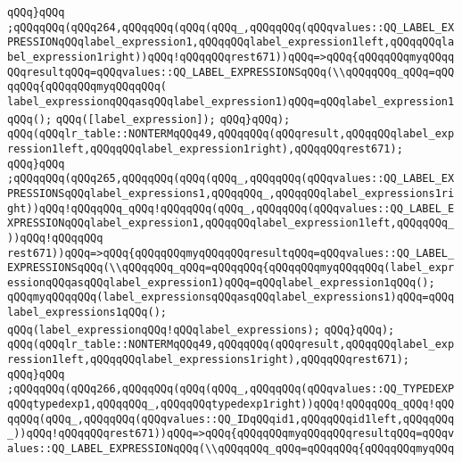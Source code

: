 \verb|qQQq}qQQq|\newline
\verb|;qQQqqQQq(qQQq264,qQQqqQQq(qQQq(qQQq_,qQQqqQQq(qQQqvalues::QQ_LABEL_EXPRESSIONqQQqlabel_expression1,qQQqqQQqlabel_expression1left,qQQqqQQqlabel_expression1right))qQQq!qQQqqQQqrest671))qQQq=>qQQq{qQQqqQQqmyqQQqqQQqresultqQQq=qQQqvalues::QQ_LABEL_EXPRESSIONSqQQq(\\qQQqqQQq_qQQq=qQQqqQQq{qQQqqQQqmyqQQqqQQq(|\newline
\verb|label_expressionqQQqasqQQqlabel_expression1)qQQq=qQQqlabel_expression1qQQq();|\newline
\verb|qQQq([label_expression]);|\newline
\verb|qQQq}qQQq);|\newline
\verb|qQQq(qQQqlr_table::NONTERMqQQq49,qQQqqQQq(qQQqresult,qQQqqQQqlabel_expression1left,qQQqqQQqlabel_expression1right),qQQqqQQqrest671);|\newline
\verb|qQQq}qQQq|\newline
\verb|;qQQqqQQq(qQQq265,qQQqqQQq(qQQq(qQQq_,qQQqqQQq(qQQqvalues::QQ_LABEL_EXPRESSIONSqQQqlabel_expressions1,qQQqqQQq_,qQQqqQQqlabel_expressions1right))qQQq!qQQqqQQq_qQQq!qQQqqQQq(qQQq_,qQQqqQQq(qQQqvalues::QQ_LABEL_EXPRESSIONqQQqlabel_expression1,qQQqqQQqlabel_expression1left,qQQqqQQq_))qQQq!qQQqqQQq|\newline
\verb|rest671))qQQq=>qQQq{qQQqqQQqmyqQQqqQQqresultqQQq=qQQqvalues::QQ_LABEL_EXPRESSIONSqQQq(\\qQQqqQQq_qQQq=qQQqqQQq{qQQqqQQqmyqQQqqQQq(label_expressionqQQqasqQQqlabel_expression1)qQQq=qQQqlabel_expression1qQQq();|\newline
\verb|qQQqmyqQQqqQQq(label_expressionsqQQqasqQQqlabel_expressions1)qQQq=qQQq|\newline
\verb|label_expressions1qQQq();|\newline
\verb|qQQq(label_expressionqQQq!qQQqlabel_expressions);|\newline
\verb|qQQq}qQQq);|\newline
\verb|qQQq(qQQqlr_table::NONTERMqQQq49,qQQqqQQq(qQQqresult,qQQqqQQqlabel_expression1left,qQQqqQQqlabel_expressions1right),qQQqqQQqrest671);|\newline
\verb|qQQq}qQQq|\newline
\verb|;qQQqqQQq(qQQq266,qQQqqQQq(qQQq(qQQq_,qQQqqQQq(qQQqvalues::QQ_TYPEDEXPqQQqtypedexp1,qQQqqQQq_,qQQqqQQqtypedexp1right))qQQq!qQQqqQQq_qQQq!qQQqqQQq(qQQq_,qQQqqQQq(qQQqvalues::QQ_IDqQQqid1,qQQqqQQqid1left,qQQqqQQq_))qQQq!qQQqqQQqrest671))qQQq=>qQQq{qQQqqQQqmyqQQqqQQqresultqQQq=qQQqvalues::QQ_LABEL_EXPRESSIONqQQq(\\qQQqqQQq_qQQq=qQQqqQQq{qQQqqQQqmyqQQq|\newline
